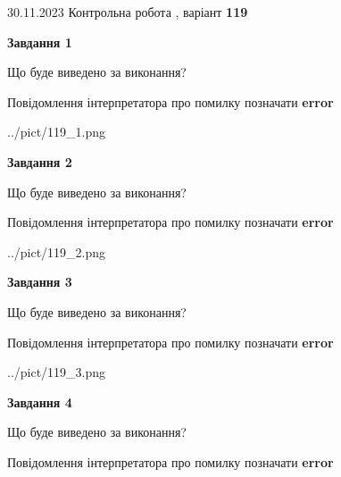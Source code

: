 \documentclass[12pt, ukrainian]{article}
\begin{document}
{{30.11.2023 Контрольна робота , варіант  \No \textbf { 119 }\par}}
{




{\begin {center}\textbf{Завдання 1}\end {center}}\par
Що буде виведено за виконання? \par
Повідомлення інтерпретатора про помилку позначати \textbf{error}

\begin{center}
	{../pict/119_1.png}
\end{center}
\newpage

{\begin {center}\textbf{Завдання 2}\end {center}}\par
Що буде виведено за виконання? \par
Повідомлення інтерпретатора про помилку позначати \textbf{error}

\begin{center}
	{../pict/119_2.png}
\end{center}
\newpage

{\begin {center}\textbf{Завдання 3}\end {center}}\par
Що буде виведено за виконання? \par
Повідомлення інтерпретатора про помилку позначати \textbf{error}

\begin{center}
	{../pict/119_3.png}
\end{center}
\newpage

{\begin {center}\textbf{Завдання 4}\end {center}}\par
Що буде виведено за виконання? \par
Повідомлення інтерпретатора про помилку позначати \textbf{error}

}
\end{document}
